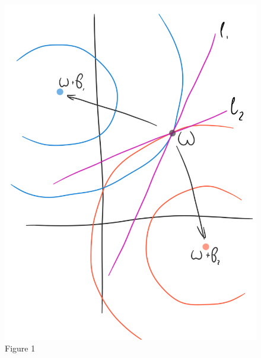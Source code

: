 \documentclass{article}
\begin{document}
\begin{figure}[b!]
	\centering
	\parbox{7cm}{
		\includegraphics[scale=0.25]{pics/M4/battaglini03.png}
		\caption{Figure 1}
		\label{fig:1}
	}
	\qquad
	\parbox{7cm}{
}
\end{figure}
\end{document}
